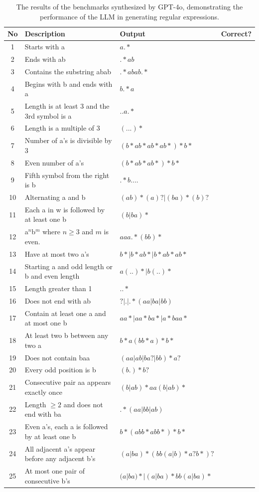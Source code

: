 \begin{table}[h!]
	\centering
	\caption{The results of the benchmarks synthesized by GPT-4o, demonstrating the performance of the LLM in generating regular expressions.}
	\label{tab:llm_outputs}
	\begin{tabular}{|c|l|l|l|}
	\hline
	\textbf{No} & \textbf{Description} & \textbf{Output} & \textbf{Correct?} \\
	\hline
	1 & Starts with a & $a.*$ & \tikzcmark \\
	2 & Ends with ab & $.*ab$ & \tikzcmark \\
	3 & Contains the substring abab & $.*abab.*$ & \tikzcmark \\
	4 & Begins with b and ends with a & $b.*a$ & \tikzcmark \\
	5 & Length is at least 3 and the 3rd symbol is a & $..a.*$ & \tikzcmark \\
	6 & Length is a multiple of 3 & $(...)*$ & \tikzcmark \\
	7 & Number of a's is divisible by 3 & $(b*ab*ab*ab*)*b*$ & \tikzcmark \\
	8 & Even number of a's & $(b*ab*ab*)*b*$ & \tikzcmark \\
	9 & Fifth symbol from the right is b & $.*b....$ & \tikzcmark \\
	10 & Alternating a and b & $(ab)*(a)?|(ba)*(b)?$ & \tikzcmark \\
	11 & Each a in w is followed by at least one b & $(b|ba)*$ & \tikzcmark \\
	12 & a$^n$b$^m$ where $n \geq 3$ and $m$ is even. & $aaa.*(bb)*$ & \tikzxmark \\
	13 & Have at most two a's & $b*|b*ab*|b*ab*ab*$ & \tikzcmark \\
	14 & Starting a and odd length or b and even length & $a(..)* | b(..)*$ & \tikzxmark \\
	15 & Length greater than 1 & $..*$ & \tikzxmark \\
	16 & Does not end with ab & $?|.|.*(aa|ba|bb)$ & \tikzxmark \\
	17 & Contain at least one a and at most one b & $aa*|aa*ba*|a*baa*$ & \tikzcmark \\
	18 & At least two b between any two a & $b*a(bb*a)*b*$ & \tikzxmark \\
	19 & Does not contain baa & $(aa|ab|ba?|bb)*a?$ & \tikzxmark \\
	20 & Every odd position is b & $(b.)*b?$ & \tikzcmark \\
	21 & Consecutive pair aa appears exactly once & $(b|ab)*aa(b|ab)*$ & \tikzxmark \\
	22 & Length $\ge 2$ and does not end with ba & $.*(aa|bb|ab)$ & \tikzcmark \\
	23 & Even a's, each a is followed by at least one b & $b*(abb*abb*)*b*$ & \tikzcmark \\
	24 & All adjacent a's appear before any adjacent b's & $(a|ba)*(bb(a|b)*a?b*)?$ & \tikzxmark \\
	25 & At most one pair of consecutive b's & $(a|ba)* | (a|ba)*bb(a|ba)*$ & \tikzxmark \\
	\hline
\end{tabular}
\end{table}


